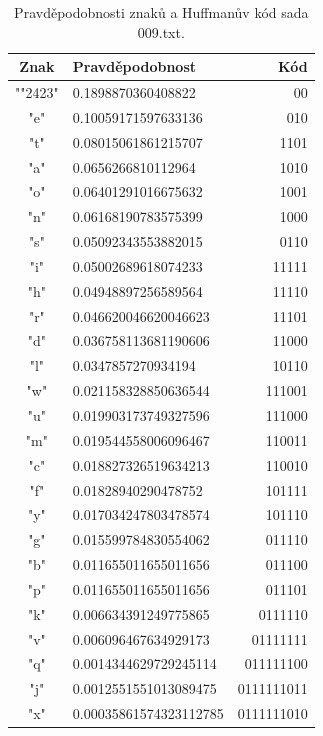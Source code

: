 \documentclass[12pt]{article}
\def\textvisiblespace{{\TVSp\char"2423}}
\begin{document}
			\begin{table}[!ht]
\centering
\begin{tabular}{ | c | l | r | } \hline
Znak    &       Pravděpodobnost &       Kód     \\ \hline
"\textvisiblespace "    &       0.1898870360408822      &       00      \\ \hline
"e"     &       0.10059171597633136     &       010     \\ \hline
"t"     &       0.08015061861215707     &       1101    \\ \hline
"a"     &       0.0656266810112964      &       1010    \\ \hline
"o"     &       0.06401291016675632     &       1001    \\ \hline
"n"     &       0.06168190783575399     &       1000    \\ \hline
"s"     &       0.05092343553882015     &       0110    \\ \hline
"i"     &       0.05002689618074233     &       11111   \\ \hline
"h"     &       0.04948897256589564     &       11110   \\ \hline
"r"     &       0.046620046620046623    &       11101   \\ \hline
"d"     &       0.036758113681190606    &       11000   \\ \hline
"l"     &       0.0347857270934194      &       10110   \\ \hline
"w"     &       0.021158328850636544    &       111001  \\ \hline
"u"     &       0.019903173749327596    &       111000  \\ \hline
"m"     &       0.019544558006096467    &       110011  \\ \hline
"c"     &       0.018827326519634213    &       110010  \\ \hline
"f"     &       0.01828940290478752     &       101111  \\ \hline
"y"     &       0.017034247803478574    &       101110  \\ \hline
"g"     &       0.015599784830554062    &       011110  \\ \hline
"b"     &       0.011655011655011656    &       011100  \\ \hline
"p"     &       0.011655011655011656    &       011101  \\ \hline
"k"     &       0.006634391249775865    &       0111110 \\ \hline
"v"     &       0.006096467634929173    &       01111111        \\ \hline
"q"     &       0.0014344629729245114   &       011111100       \\ \hline
"j"     &       0.0012551551013089475   &       0111111011      \\ \hline
"x"     &       0.00035861574323112785  &       0111111010      \\ \hline
\end{tabular}
\caption{Pravděpodobnosti znaků a Huffmanův kód sada 009.txt.}
\label{pzhk_009.txt_table}
\end{table}
   		
\end{document}
